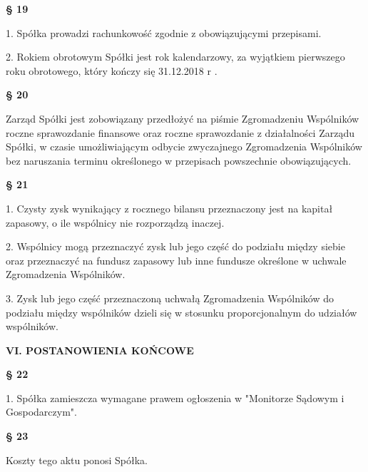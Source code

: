 \centerline{\large\textbf{§ 19}}

1. Spółka prowadzi rachunkowość zgodnie z obowiązującymi przepisami.

2. Rokiem obrotowym Spółki jest rok kalendarzowy, za wyjątkiem pierwszego roku obrotowego, który kończy się 31.12.2018 r .\\

\centerline{\large\textbf{§ 20}}

Zarząd Spółki jest zobowiązany przedłożyć na piśmie Zgromadzeniu Wspólników roczne sprawozdanie finansowe oraz roczne sprawozdanie z działalności Zarządu Spółki, w czasie umożliwiającym odbycie zwyczajnego Zgromadzenia Wspólników bez naruszania terminu określonego w przepisach powszechnie obowiązujących.\\

\centerline{\large\textbf{§ 21}}

1. Czysty zysk wynikający z rocznego bilansu przeznaczony jest na kapitał zapasowy, o ile wspólnicy nie rozporządzą inaczej.

2. Wspólnicy mogą przeznaczyć zysk lub jego część do podziału między siebie oraz przeznaczyć na fundusz zapasowy lub inne fundusze określone w uchwale Zgromadzenia Wspólników.

3. Zysk lub jego część przeznaczoną uchwałą Zgromadzenia Wspólników do podziału między wspólników dzieli się w stosunku proporcjonalnym do udziałów wspólników.\\

\centerline{\large\textbf{VI. POSTANOWIENIA KOŃCOWE}}

\centerline{\large\textbf{§ 22}}

1. Spółka zamieszcza wymagane prawem ogłoszenia w "Monitorze Sądowym i Gospodarczym".\\

\centerline{\large\textbf{§ 23}}

Koszty tego aktu ponosi Spółka.
